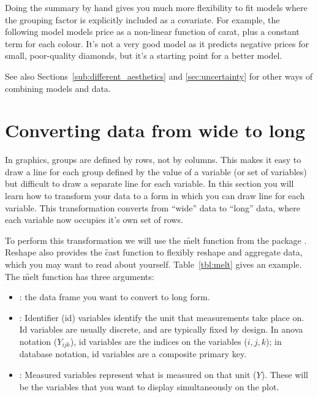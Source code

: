 Doing the summary by hand gives you much more flexibility to fit models where the grouping factor is explicitly included as a covariate. For example, the following model models price as a non-linear function of carat, plus a constant term for each colour. It's not a very good model as it predicts negative prices for small, poor-quality diamonds, but it's a starting point for a better model.

% 


See also Sections~\ref{sub:different_aesthetics} and \ref{sec:uncertainty} for other ways of combining models and data.

\section{Converting data from wide to long}
\label{sec:melting}

In \ggplot graphics, groups are defined by rows, not by columns. This makes it easy to draw a line for each group defined by the value of a variable (or set of variables) but difficult to draw a separate line for each variable. In this section you will learn how to transform your data to a form in which you can draw line for each variable. This transformation converts from ``wide'' data to ``long'' data, where each variable now occupies it's own set of rows.

To perform this transformation we will use the \f{melt} function from the  package \citep{wickham:2007b}. Reshape also provides the \f{cast} function to flexibly reshape and aggregate data, which you may want to read about yourself. Table~\ref{tbl:melt} gives an example. The \f{melt} function has three arguments:

\begin{itemize}

  \item {}: the data frame you want to convert to long form.

  \item {}: Identifier (id) variables identify the unit that measurements take place on. Id variables are usually discrete, and are typically fixed by design. In {\sc anova} notation ($Y_{ijk}$), id variables are the indices on the variables ($i, j, k$); in database notation, id variables are a composite primary key.

  \item {}: Measured variables represent what is measured on that unit ($Y$). These will be the variables that you want to display simultaneously on the plot.

\end{itemize}

